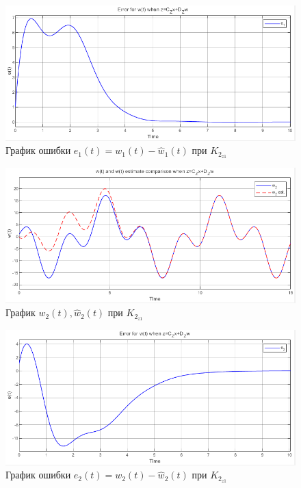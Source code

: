 \documentclass[a4paper, 12pt]{article}
\begin{document}
    \begin{figure}[H]
        \centering
        \includegraphics[scale=0.75]{3task_we1czdz.png}
        \captionsetup{skip=0pt}
        \caption{График ошибки $e_1(t)=w_1(t)-\hat{w}_1(t)$ при $K_{2_{z1}}$}
        \label{fig:3task_we1czdz}
    \end{figure}
    \begin{figure}[H]
        \centering
        \includegraphics[scale=0.75]{3task_wwh2czdz.png}
        \captionsetup{skip=0pt}
        \caption{График $w_2(t),\hat{w}_2(t)$ при $K_{2_{z1}}$}
        \label{fig:3task_wwh2czdz}
    \end{figure}
    \begin{figure}[H]
        \centering
        \includegraphics[scale=0.75]{3task_we2czdz.png}
        \captionsetup{skip=0pt}
        \caption{График ошибки $e_2(t)=w_2(t)-\hat{w}_2(t)$ при $K_{2_{z1}}$}
        \label{fig:3task_we2czdz}
    \end{figure}
\end{document}

